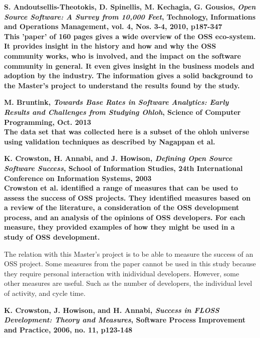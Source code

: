 \begin{thebibliography}{99}

	 \bfseries{S. Andoutsellis-Theotokis, D. Spinellis, M.
		Kechagia, G. Gousios, \emph{Open Source Software: A Survey from 10,000
		Feet}, Technology, Informations and Operations Management, vol. 4, Nos.
		3-4, 2010, p187-347}\rm
		\\

		This 'paper' of 160 pages gives a wide overview of the OSS eco-system. It
		provides insight in the history and how and why the OSS community works, who
		is involved, and the impact on the software community in general. It even
		gives insight in the business models and adoption by the industry. The
		information gives a solid background to the Master's project to understand
		the results found by the study.
		
	 \bfseries{M. Bruntink, \emph{Towards Base Rates in Software
		Analytics: Early Results and Challenges from Studying Ohloh}, Science of
		Computer Programming, Oct. 2013}\rm
		\\

		The data set that was collected here is a subset of the ohloh universe using
		validation techniques as described by Nagappan et al.

	 \bfseries{K. Crowston, H. Annabi, and J. Howison,
		\emph{Defining Open Source Software Success}, School of Information Studies,
		24th International Conference on Information Systems, 2003}\rm
		\\

		Crowston et al. identified a range of measures that can be used to assess the
		success of OSS projects. They identified measures based on a review of the
		literature, a consideration of the OSS development process, and an analysis of
		the opinions of OSS developers. For each measure, they provided examples of
		how they might be used in a study of OSS development.

		The relation with this Master's project is to be able to measure the success
		of an OSS project. Some measures from the paper cannot be used in this study
		because they require personal interaction with inidividual developers.
		However, some other measures are useful. Such as the number of developers, the
		individual level of activity, and cycle time.
		
	 \bfseries{K. Crowston, J. Howison, and H. Annabi,
		\emph{Success in FLOSS Development: Theory and Measures}, Software Process
		Improvement and Practice, 2006, no. 11, p123-148}\rm
		\\


\end{thebibliography}
